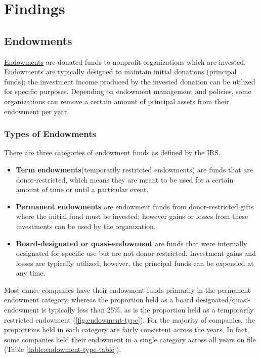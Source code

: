 \documentclass[Dance Data
Project,article,submit,moreauthors,pdftex]{mdpi}
\providecommand{\tightlist}{%
  \setlength{\itemsep}{0pt}\setlength{\parskip}{0pt}}
\begin{document}
\hypertarget{findings}{%
\section{Findings}\label{findings}}

\hypertarget{endowments}{%
\subsection{Endowments}\label{endowments}}

\href{https://www.investopedia.com/terms/e/endowment.asp}{Endowments}
are donated funds to nonprofit organizations which are invested.
Endowments are typically designed to maintain initial donations
(principal funds); the investment income produced by the invested
donation can be utilized for specific purposes. Depending on endowment
management and policies, some organizations can remove a certain amount
of principal assets from their endowment per year.

\hypertarget{types-of-endowments}{%
\subsubsection{Types of Endowments}\label{types-of-endowments}}

There are \href{https://www.irs.gov/instructions/i990sd}{three
categories} of endowment funds as defined by the IRS.

\begin{itemize}
\tightlist
\item
  \textbf{Term endowments}(temporarily restricted endowments) are funds
  that are donor-restricted, which means they are meant to be used for a
  certain amount of time or until a particular event.
\item
  \textbf{Permanent endowments} are endowment funds from
  donor-restricted gifts where the initial fund must be invested;
  however gains or losses from these investments can be used by the
  organization.\\
\item
  \textbf{Board-designated or quasi-endowment} are funds that were
  internally designated for specific use but are not donor-restricted.
  Investment gains and losses are typically utilized; however, the
  principal funds can be expended at any time.
\end{itemize}

Most dance companies have their endowment funds primarily in the
permanent endowment category, whereas the proportion held as a board
designated/quasi-endowment is typically less than 25\%, as is the
proportion held as a temporarily restricted endowment
(\ref{fig:endowment-type}). For the majority of companies, the
proportions held in each category are fairly consistent across the
years. In fact, some companies held their endowment in a single category
across all years on file (Table \ref{table:endowment-type-table}).
\end{document}
